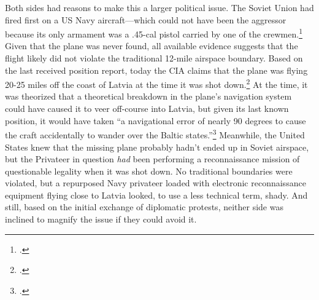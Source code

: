 \documentclass[14pt]{extarticle}
\begin{document}
Both sides had reasons to make this a larger political issue. The Soviet Union had fired first on a US Navy aircraft---which could not have been the aggressor because its only armament was a .45-cal pistol carried by one of the crewmen.\footcite[p.~7]{peterson_maybe_1993} Given that the plane was never found, all available evidence suggests that the flight likely did not violate the traditional 12-mile airspace boundary. Based on the last received position report, today the CIA claims that the plane was flying 20-25 miles off the coast of Latvia at the time it was shot down.\footcite[p.~7]{peterson_maybe_1993} At the time, it was theorized that a theoretical breakdown in the plane's navigation system could have caused it to veer off-course into Latvia, but given its last known position, it would have taken \enquote{a navigational error of nearly 90 degrees to cause the craft accidentally to wander over the Baltic states.}\footcite{the_new_york_times_soviet_1950} Meanwhile, the United States knew that the missing plane probably hadn't ended up in Soviet airspace, but the Privateer in question \emph{had} been performing a reconnaissance mission of questionable legality when it was shot down. No traditional boundaries were violated, but a repurposed Navy privateer loaded with electronic reconnaissance equipment flying close to Latvia looked, to use a less technical term, shady. And still, based on the initial exchange of diplomatic protests, neither side was inclined to magnify the issue if they could avoid it.

\end{document}

